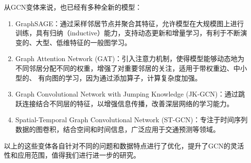 \documentclass[12pt]{ctexart} %
\begin{document}
从GCN变体来说，也已经有多种全新的模型：
\begin{enumerate}
    \item GraphSAGE\cite{hamilton_inductive_2018}：通过采样邻居节点并聚合其特征，允许模型在大规模图上进行训练，具有归纳（inductive）能力，支持动态更新和增量学习，有利于不断演变的、大型、低维特征的一般图学习。
    \item Graph Attention Network (GAT)\cite{velickovic_graph_2018}：引入注意力机制，使得模型能够动态地为不同邻居分配不同的权重，增强了对重要邻居的关注，适用于带权重边、中小型的、
        有向图的学习，因为通过添加算子，计算复杂度加强。
    \item Graph Convolutional Network with Jumping Knowledge (JK-GCN)\cite{xu_representation_2018}：通过跳跃连接结合不同层的特征，以增强信息传播，改善深层网络的学习能力。
    \item Spatial-Temporal Graph Convolutional Network (ST-GCN)\cite{yan_spatial_2018}：专注于时间序列数据的图卷积，结合空间和时间信息，广泛应用于交通预测等领域。
\end{enumerate}

以上的这些变体各自针对不同的问题和数据特点进行了优化，提升了GCN的灵活性和应用范围，值得我们进行进一步的研究。



\end{document}
